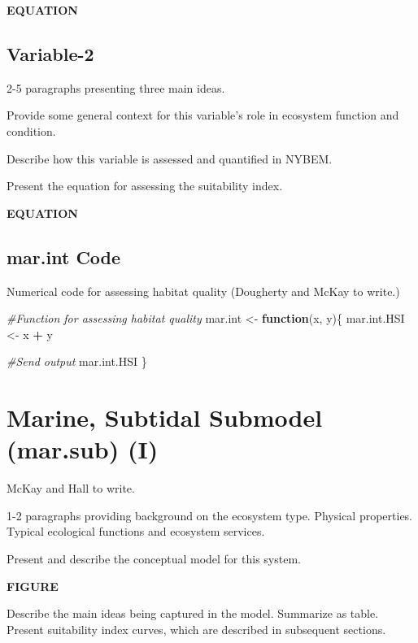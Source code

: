 \documentclass[
]{book}
\newenvironment{Shaded}{\begin{snugshade}}{\end{snugshade}}
\newcommand{\CommentTok}[1]{\textcolor[rgb]{0.56,0.35,0.01}{\textit{#1}}}
\newcommand{\ControlFlowTok}[1]{\textcolor[rgb]{0.13,0.29,0.53}{\textbf{#1}}}
\newcommand{\NormalTok}[1]{#1}
\newcommand{\OperatorTok}[1]{\textcolor[rgb]{0.81,0.36,0.00}{\textbf{#1}}}
\newcommand{\StringTok}[1]{\textcolor[rgb]{0.31,0.60,0.02}{#1}}
\begin{document}
\textbf{EQUATION}

\hypertarget{variable-2-2}{%
\subsection{Variable-2}\label{variable-2-2}}

2-5 paragraphs presenting three main ideas.

Provide some general context for this variable's role in ecosystem function and condition.

Describe how this variable is assessed and quantified in NYBEM.

Present the equation for assessing the suitability index.

\textbf{EQUATION}

\hypertarget{mar.int-code}{%
\subsection{mar.int Code}\label{mar.int-code}}

Numerical code for assessing habitat quality ({Dougherty and McKay to write.})

\begin{Shaded}
\begin{Highlighting}[]
\CommentTok{#Function for assessing habitat quality}
\NormalTok{mar.int <-}\StringTok{ }\ControlFlowTok{function}\NormalTok{(x, y)\{}
\NormalTok{  mar.int.HSI <-}\StringTok{ }\NormalTok{x }\OperatorTok{+}\StringTok{ }\NormalTok{y}

  \CommentTok{#Send output}
\NormalTok{  mar.int.HSI}
\NormalTok{\}}
\end{Highlighting}
\end{Shaded}

\hypertarget{marine-subtidal-submodel-mar.sub-i}{%
\section{Marine, Subtidal Submodel (mar.sub) (I)}\label{marine-subtidal-submodel-mar.sub-i}}

{McKay and Hall to write.}

1-2 paragraphs providing background on the ecosystem type. Physical properties. Typical ecological functions and ecosystem services.

Present and describe the conceptual model for this system.

\textbf{FIGURE}

Describe the main ideas being captured in the model. Summarize as table. Present suitability index curves, which are described in subsequent sections.
\end{document}
